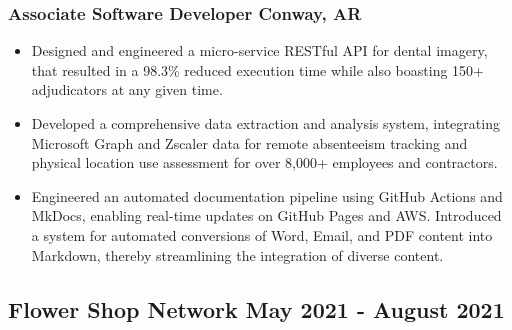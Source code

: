 \documentclass[10pt]{article}
\begin{document}
\subsubsection{Associate Software Developer \hfill Conway, AR}
\begin{itemize}

    \item Designed and engineered a micro-service RESTful API for dental imagery, that resulted in a 98.3\% reduced execution time while also boasting 150+ adjudicators at any given time. 
    \\ %
    \item Developed a comprehensive data extraction and analysis system, integrating Microsoft Graph and Zscaler data for remote absenteeism tracking and physical location use assessment for over 8,000+ employees and contractors.
    \\ %
    \item Engineered an automated documentation pipeline using GitHub Actions and MkDocs, enabling real-time updates on GitHub Pages and AWS. Introduced a system for automated conversions of Word, Email, and PDF content into Markdown, thereby streamlining the integration of diverse content.
\end{itemize}

\subsection{Flower Shop Network \hfill May 2021 - August 2021}
\end{document}
